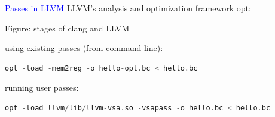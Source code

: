 \begin{frame}[fragile]{\textcolor{blue}{Passes in LLVM}}
LLVM's analysis and optimization framework {\color{blue} opt}:


\vspace{2cm}
\begin{center}
Figure: stages of clang and LLVM
\end{center}
\vspace{2cm}


using existing passes (from command line):
\begin{footnotesize}
\begin{lstlisting}[language=C++]
opt -load -mem2reg -o hello-opt.bc < hello.bc
\end{lstlisting}
\end{footnotesize}
running user passes:
\begin{footnotesize}
\begin{lstlisting}[language=C++]
opt -load llvm/lib/llvm-vsa.so -vsapass -o hello.bc < hello.bc
\end{lstlisting}
\end{footnotesize}

\end{frame}
